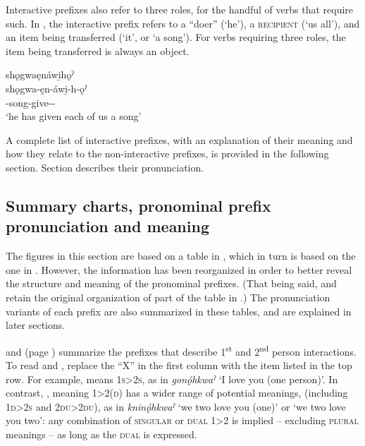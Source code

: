 Interactive prefixes also refer to three roles, for the handful of verbs that require such. In , the interactive prefix  refers to a “doer” (‘he’), a \textsc{recipient} (‘us all’), and an item being transferred (‘it’, or ‘a song’). For verbs requiring three roles, the item being transferred is always an object.

\ea\label{ex:interex200} shǫgwaęnáwi̱hǫˀ\\
\gll shǫgwa-ęn-áwi̱-h-ǫˀ\\
-song-give-{\stat}-{\distributive}\\
\glt ‘he has given each of us a song’
\z

A complete list of interactive prefixes, with an explanation of their meaning and how they relate to the non-interactive prefixes, is provided in the following section. Section  describes their pronunciation.


\subsection{Summary charts, pronominal prefix pronunciation and meaning} \label{Summary charts, pronominal prefix pronunciation and meaning}
The figures in this section are based on a table in \citet{foster_course_1993}, which in turn is based on the one in \citet{lounsbury_oneida_1953}. However, the information has been reorganized in order to better reveal the structure and meaning of the pronominal prefixes. (That being said,  and  retain the original organization of part of the table in \cite{foster_course_1993}.) The pronunciation variants of each prefix are also summarized in these tables, and are explained in later sections.

 and  (page \pageref{figtab:2:1 interactions}) summarize the prefixes that describe 1\textsuperscript{st} and 2\textsuperscript{nd} person interactions.  To read  and , replace the “X” in the first column with the item listed in the top row. For example,  means \textsc{1s>2s}, as in \textit{gonǫ́hkwaˀ} ‘I love you (one person)’. In contrast, , meaning \textsc{1>2(d)} has a wider range of potential meanings, (including \textsc{1d>2s} and \textsc{2du>2du)}, as in \textit{kninǫ́hkwaˀ} ‘we two love you (one)’ or ‘we two love you two’: any combination of \textsc{singular} or \textsc{dual} \textsc{1>2} is implied -- excluding \textsc{plural} meanings -- as long as the \textsc{dual} is expressed.

